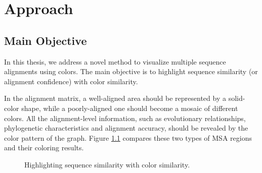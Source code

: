 \chapter{Approach}\label{chap:Approach}

\section{Main Objective}

In this thesis, we address a novel method to visualize multiple sequence alignments using colors. The main objective is to highlight sequence similarity (or alignment confidence) with color similarity.

In the alignment matrix, a well-aligned area should be represented by a solid-color shape, while a poorly-aligned one should become a mosaic of different colors. All the alignment-level information, such as evolutionary relationships, phylogenetic characteristics and alignment accuracy, should be revealed by the color pattern of the graph. Figure \ref{fig:app-wa} compares these two types of MSA regions and their coloring results.

\begin{figure}[hbt]
\centering
{}
\hspace{5mm}
\caption[Highlighting Sequence Similarity With Color Similarity]{Highlighting sequence similarity with color similarity.}\label{fig:app-wa}
\end{figure}

